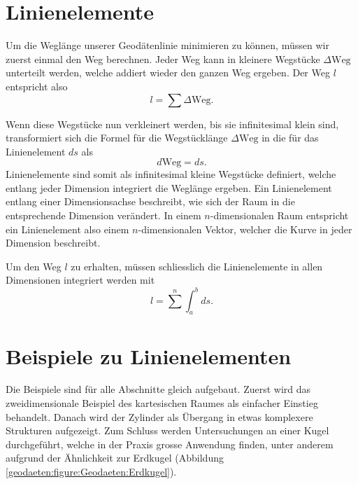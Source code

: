 %
%
%
%
\section{Linienelemente\label{geodaeten:section:Linienelemente}}

Um die Weglänge unserer Geodätenlinie minimieren zu können, müssen wir zuerst einmal den Weg berechnen.
%
Jeder Weg kann in kleinere Wegstücke $\Delta \text{Weg}$ unterteilt werden, welche addiert wieder den ganzen Weg ergeben.
Der Weg $l$ entspricht also
\begin{equation}
	l = \sum \Delta \text{Weg} .
\end{equation}

Wenn diese Wegstücke nun verkleinert werden, bis sie infinitesimal klein sind, transformiert sich die Formel für die Wegstücklänge $\Delta \text{Weg}$ in die für das Linienelement $ds$ als
\begin{equation}	
	d\text{Weg} = ds .
	\label{geodaeten:equation:Linienelemente:equation1}
\end{equation}
Linienelemente sind somit als infinitesimal kleine Wegstücke definiert, welche entlang jeder Dimension integriert die Weglänge ergeben.
Ein Linienelement entlang einer Dimensionsachse beschreibt, wie sich der Raum in die entsprechende Dimension verändert.
In einem $n$-dimensionalen Raum entspricht ein Linienelement also einem $n$-dimensionalen Vektor, welcher die Kurve in jeder Dimension beschreibt.

Um den Weg $l$ zu erhalten, müssen schliesslich die Linienelemente in allen Dimensionen integriert werden mit
\begin{equation}
	l = 
	\sum^{n} \int_a^b ds .
	\label{geodaeten:equation:Linienelemente:equation2}
\end{equation}

\section{Beispiele zu Linienelementen\label{geodaeten:section:Linienelemente:Beispiele}}
Die Beispiele sind für alle Abschnitte gleich aufgebaut.
Zuerst wird das zweidimensionale Beispiel des kartesischen Raumes als einfacher Einstieg behandelt.
%
Danach wird der Zylinder als Übergang in etwas komplexere Strukturen aufgezeigt.
%
Zum Schluss werden Untersuchungen an einer Kugel durchgeführt, welche in der Praxis grosse Anwendung finden, unter anderem aufgrund der Ähnlichkeit zur Erdkugel (Abbildung \ref{geodaeten:figure:Geodaeten:Erdkugel}).





